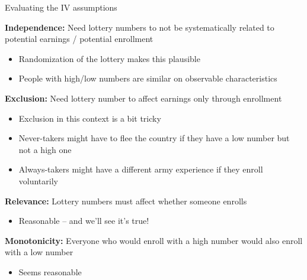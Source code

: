 \documentclass[11pt,english,handout]{beamer}
\newenvironment{wideitemize}{\itemize\addtolength{\itemsep}{10pt}}{\enditemize}
\begin{document}
\begin{frame}{Evaluating the IV assumptions}
	\begin{wideitemize}
		\item
		\textbf{Independence:} \pause{} Need lottery numbers to not be systematically related to potential earnings / potential enrollment \pause
			\begin{itemize}
				\item 
				Randomization of the lottery makes this plausible
				\item
				People with high/low numbers are similar on observable characteristics
			\end{itemize}
		
		\item
		\textbf{Exclusion:} \pause{} Need lottery number to affect earnings only through enrollment
			\pause
			\begin{itemize}
				\item 
				Exclusion in this context is a bit tricky
				
				\item
				Never-takers might have to flee the country if they have a low number but not a high one
				
				\item
				Always-takers might have a different army experience if they enroll voluntarily
			\end{itemize}
		
		
		\item
		\textbf{Relevance:} \pause{} Lottery numbers must affect whether someone enrolls \pause 
			\begin{itemize}
				\item 
				Reasonable -- and we'll see it's true!
			\end{itemize}
		
		\pause
		\item
		\textbf{Monotonicity:} Everyone who would enroll with a high number would also enroll with a low number \pause
			\begin{itemize}
				\item Seems reasonable
			\end{itemize}
		
	\end{wideitemize}
\end{frame}
\end{document}
